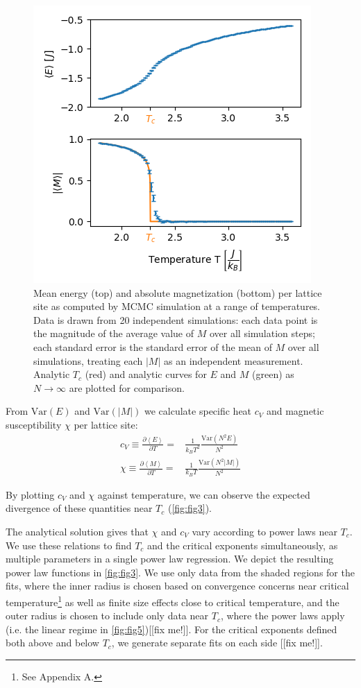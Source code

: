 \documentclass[letter,scriptaddress,twocolumn, prl,nofootinbib]{revtex4}
\newcommand{\submin}[1]{\left\langle #1 \right\rangle}
\newcommand{\Var}[1]{\text{Var}\left( #1 \right)}
\begin{document}
\begin{figure}[h]
	\begin{center}
		\includegraphics[width=.5\textwidth]{figs/fig2_EMplots.png}
		\caption{Mean energy (top) and absolute magnetization (bottom) per lattice site as computed by MCMC simulation at a range of temperatures. Data is drawn from 20 independent simulations: each data point is the magnitude of the average value of $M$ over all simulation steps; each standard error is the standard error of the mean of $M$ over all simulations, treating each $|M|$ as an independent measurement. Analytic $T_c$ (red) and analytic curves for $E$ and $M$ (green) as $N\rightarrow\infty$ are plotted for comparison.}
		\label{fig:fig2}
	\end{center}
\end{figure}

From $\Var{E}$ and $\Var{|M|}$ we calculate specific heat $c_V$ and magnetic susceptibility $\chi$ per lattice site:
\begin{align}
	c_V \equiv \frac{\partial \submin{E}}{\partial T} = & \frac{1}{k_BT^2}\frac{\Var{N^2 E}}{N^2} \label{eq:cv} \\
	\chi \equiv \frac{\partial \submin{M}}{\partial T} = & \frac{1}{k_BT}\frac{\Var{N^2 |M|}}{N^2}	\label{eq:chi}
\end{align}


By plotting $c_V$ and $\chi$ against temperature, we can observe the expected divergence of these quantities near $T_c$ (\autoref{fig:fig3}).

The analytical solution gives that $\chi$ and $c_V$ vary according to power laws near $T_c$. We use these relations to find $T_c$ and the critical exponents simultaneously, as multiple parameters in a single power law regression. We depict the resulting power law functions in \autoref{fig:fig3}.
We use only data from the shaded regions for the fits, where the inner radius is chosen based on convergence concerns near critical temperature\footnote{See Appendix A.} as well as finite size effects close to critical temperature, and the outer radius is chosen to include only data near $T_c$, where the power laws apply (i.e. the linear regime in \autoref{fig:fig5})[[fix me!]]. For the critical exponents defined both above and below $T_c$, we generate separate fits on each side [[fix me!]].
\end{document}
